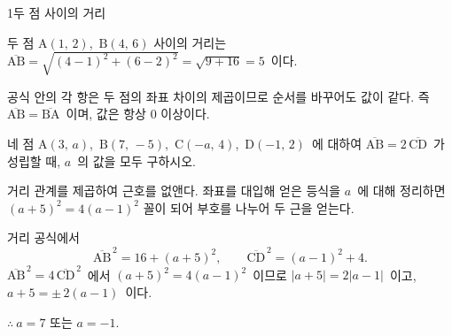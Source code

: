 \documentclass[10pt]{article}
\begin{document}
\begin{dmconcept}{1}{두 점 사이의 거리}
\begin{dmexample}
두 점 $\mathrm{A}(1,\, 2)$,\ $\mathrm{B}(4,\, 6)$ 사이의 거리는 $\overline{\mathrm{AB}} = \sqrt{(4-1)^2 + (6-2)^2} = \sqrt{9 + 16} = 5$\ 이다.
\end{dmexample}

\begin{dmnote}
공식 안의 각 항은 두 점의 좌표 차이의 제곱이므로 순서를 바꾸어도 값이 같다. 즉 $\overline{\mathrm{AB}} = \overline{\mathrm{BA}}$\ 이며, 값은 항상 $0$ 이상이다.
\end{dmnote}

\end{dmconcept}

\newpage


\begin{dmproblem}
네 점 $\mathrm{A}(3,\, a)$,\ $\mathrm{B}(7,\, -5)$,\ $\mathrm{C}(-a,\, 4)$,\ $\mathrm{D}(-1,\, 2)$\ 에 대하여 $\overline{\mathrm{AB}} = 2\,\overline{\mathrm{CD}}$\ 가 성립할 때, $a$\ 의 값을 모두 구하시오.
\end{dmproblem}

\begin{dmapproach}
거리 관계를 제곱하여 근호를 없앤다. 좌표를 대입해 얻은 등식을 $a$\ 에 대해 정리하면 $(a+5)^2 = 4(a-1)^2$ 꼴이 되어 부호를 나누어 두 근을 얻는다.
\end{dmapproach}

\begin{dmsolution}
거리 공식에서
\begin{equation*}
  \overline{\mathrm{AB}}^{\,2} = 16 + (a + 5)^2, \qquad \overline{\mathrm{CD}}^{\,2} = (a - 1)^2 + 4.
\end{equation*}
$\overline{\mathrm{AB}}^{\,2} = 4\,\overline{\mathrm{CD}}^{\,2}$\ 에서 $(a+5)^2 = 4(a-1)^2$\ 이므로 $|a+5| = 2|a-1|$\ 이고, $a + 5 = \pm\, 2(a - 1)$\ 이다.

$\therefore\ a = 7$ 또는 $a = -1$.
\end{dmsolution}

\dmchecktitle

\end{document}
